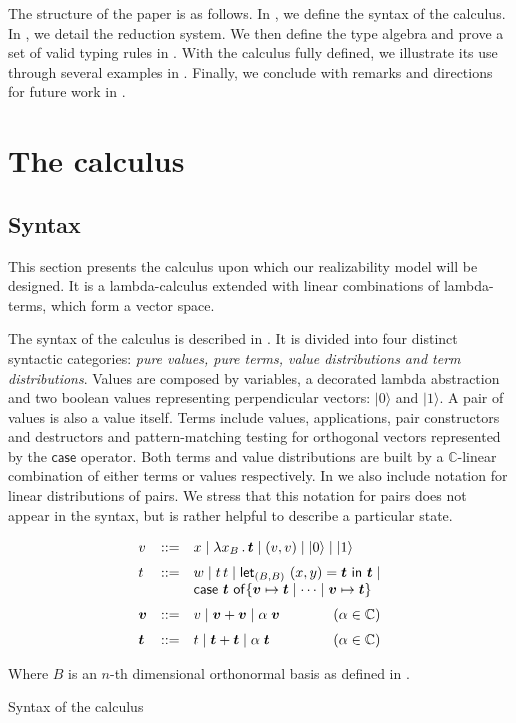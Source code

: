 \documentclass[runningheads,orivec]{llncs}
\newcommand\ket[1]{\ensuremath{|#1\rangle}}
\def\C{\mathbb{C}}            %
\def\Pair#1#2{(#1,#2)} %
\def\Lam#1#2#3{\lambda#1_{#2}\,{.}\,#3} %
\def\letkeyword{\mathsf{let}}
\def\inkeyword{\mathsf{in}}
\def\LetP#1#2#3#4#5#6{\letkeyword_{\Pair{#2}{#4}}~\Pair{#1}{#3}=#5~\inkeyword~#6}
\def\gencase#1#2#3#4#5{\ensuremath{\mathsf{case}~#1~\mathsf{of} \{#2\mapsto #4 \mid \dotsb \mid #3\mapsto #5\}}}
\begin{document}
The structure of the paper is as follows. In , we
define the syntax of the calculus. In , we detail
the reduction system. We then define the type algebra and prove a set of valid
typing rules in . With the calculus fully defined, we
illustrate its use through several examples in .
Finally, we conclude with remarks and directions for future work in
.

\section{The calculus}\label{sec:calculus}
\subsection{Syntax}

This section presents the calculus upon which our realizability model will be designed. It is a lambda-calculus extended with linear combinations of lambda-terms, which form a vector space.

The syntax of the calculus is described in . It is divided into four distinct syntactic categories: \textit{pure values, pure terms, value distributions and term distributions}. Values are composed by variables, a decorated lambda abstraction and two boolean values representing perpendicular vectors: $\ket 0$ and $\ket 1$. A pair of values is also a value itself. Terms include values, applications, pair constructors and destructors and pattern-matching testing for orthogonal vectors represented by the $\mathsf{case}$ operator. Both terms and value distributions are built by a $\C$-linear combination of either terms or values respectively. In  we also include notation for linear distributions of pairs. We stress that this notation for pairs does not appear in the syntax, but is rather helpful to describe a particular state.

\begin{table*}[t]
  \small
  \[\begin{array}{l@{\quad}rll@{}}
    v&::=& x \mid \Lam{x}B{\vec{t}} \mid (v, v) \mid\ket{0} \mid \ket{1} \\[6pt]
    t&::=& w \mid  t\,t \mid \LetP{x}{B}{y}{B}{\vec{t}}{\vec{t}} 
    \mid\\
    &&\gencase{\vec{t}}{\vec{v}}{\vec{v}}{\vec{t}}{\vec{t}}\\[6pt]
    \vec{v}&::=& v \mid \vec{v}+\vec{v} \mid 
    \alpha\;\vec{v}\qquad\hfill(\alpha\in\C)\\[6pt]
    \vec{t}&::=&
    t \mid \vec{t}+\vec{t} \mid 
    \alpha\;\vec{t}\qquad\hfill(\alpha\in\C)
   \end{array}
  \]
   
  Where $B$ is an $n$-th dimensional orthonormal basis as defined in .

  \caption{Syntax of the calculus}
  \label{tab:Syntax}
\end{table*}
\end{document}

